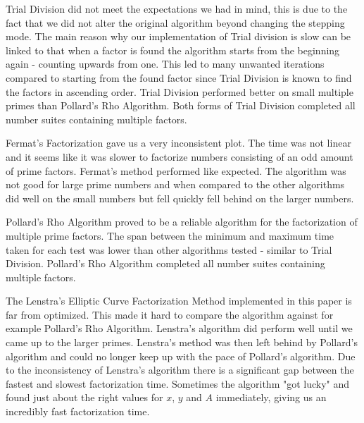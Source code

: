 Trial Division did not meet the expectations we had in mind, this is due to the fact that we did not alter the original algorithm beyond changing the stepping mode. The main reason why our implementation of Trial division is slow can be linked to that when a factor is found the algorithm starts from the beginning again - counting upwards from one. This led to many unwanted iterations compared to starting from the found factor since Trial Division is known to find the factors in ascending order. Trial Division performed better on small multiple primes than Pollard's Rho Algorithm. Both forms of Trial Division completed all number suites containing multiple factors.

Fermat's Factorization gave us a very inconsistent plot. The time was not linear and it seems like it was slower to factorize numbers consisting of an odd amount of prime factors. Fermat's method performed like expected. The algorithm was not good for large prime numbers and when compared to the other algorithms did well on the small numbers but fell quickly fell behind on the larger numbers.

Pollard's Rho Algorithm proved to be a reliable algorithm for the factorization of multiple prime factors. The span between the minimum and maximum time taken for each test was lower than other algorithms tested - similar to Trial Division. Pollard's Rho Algorithm completed all number suites containing multiple factors.

The Lenstra's Elliptic Curve Factorization Method implemented in this paper is far from optimized. This made it hard to compare the algorithm against for example Pollard's Rho Algorithm. Lenstra's algorithm did perform well until we came up to the larger primes. Lenstra's method was then left behind by Pollard's algorithm and could no longer keep up with the pace of Pollard's algorithm. Due to the inconsistency of Lenstra's algorithm there is a significant gap between the fastest and slowest factorization time. Sometimes the algorithm "got lucky" and found just about the right values for $x$, $y$ and $A$ immediately, giving us an incredibly fast factorization time.
